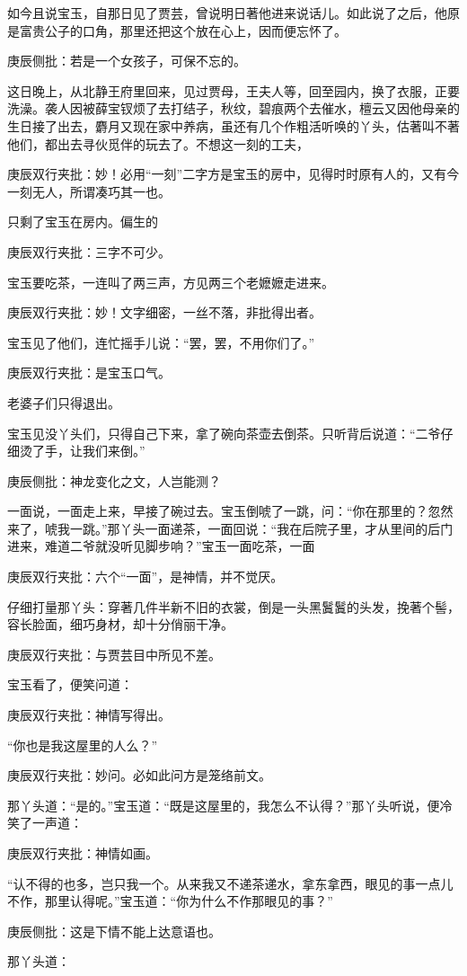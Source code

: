 \begin{parag}
    如今且说宝玉，自那日见了贾芸，曾说明日著他进来说话儿。如此说了之后，他原是富贵公子的口角，那里还把这个放在心上，因而便忘怀了。\begin{note}庚辰侧批：若是一个女孩子，可保不忘的。\end{note}这日晚上，从北静王府里回来，见过贾母，王夫人等，回至园内，换了衣服，正要洗澡。袭人因被薛宝钗烦了去打结子，秋纹，碧痕两个去催水，檀云又因他母亲的生日接了出去，麝月又现在家中养病，虽还有几个作粗活听唤的丫头，估著叫不著他们，都出去寻伙觅伴的玩去了。不想这一刻的工夫，\begin{note}庚辰双行夹批：妙！必用“一刻”二字方是宝玉的房中，见得时时原有人的，又有今一刻无人，所谓凑巧其一也。\end{note}只剩了宝玉在房内。偏生的\begin{note}庚辰双行夹批：三字不可少。\end{note}宝玉要吃茶，一连叫了两三声，方见两三个老嬷嬷走进来。\begin{note}庚辰双行夹批：妙！文字细密，一丝不落，非批得出者。\end{note}宝玉见了他们，连忙摇手儿说：“罢，罢，不用你们了。”\begin{note}庚辰双行夹批：是宝玉口气。\end{note}老婆子们只得退出。
\end{parag}


\begin{parag}
    宝玉见没丫头们，只得自己下来，拿了碗向茶壶去倒茶。只听背后说道：“二爷仔细烫了手，让我们来倒。”\begin{note}庚辰侧批：神龙变化之文，人岂能测？\end{note}一面说，一面走上来，早接了碗过去。宝玉倒唬了一跳，问：“你在那里的？忽然来了，唬我一跳。”那丫头一面递茶，一面回说：“我在后院子里，才从里间的后门进来，难道二爷就没听见脚步响？”宝玉一面吃茶，一面\begin{note}庚辰双行夹批：六个“一面”，是神情，并不觉厌。\end{note}仔细打量那丫头：穿著几件半新不旧的衣裳，倒是一头黑鬒鬒的头发，挽著个髻，容长脸面，细巧身材，却十分俏丽干净。\begin{note}庚辰双行夹批：与贾芸目中所见不差。\end{note}宝玉看了，便笑问道：\begin{note}庚辰双行夹批：神情写得出。\end{note}“你也是我这屋里的人么？”\begin{note}庚辰双行夹批：妙问。必如此问方是笼络前文。\end{note}那丫头道：“是的。”宝玉道：“既是这屋里的，我怎么不认得？”那丫头听说，便冷笑了一声道：\begin{note}庚辰双行夹批：神情如画。\end{note}“认不得的也多，岂只我一个。从来我又不递茶递水，拿东拿西，眼见的事一点儿不作，那里认得呢。”宝玉道：“你为什么不作那眼见的事？”\begin{note}庚辰侧批：这是下情不能上达意语也。\end{note}那丫头道：
\end{parag}


